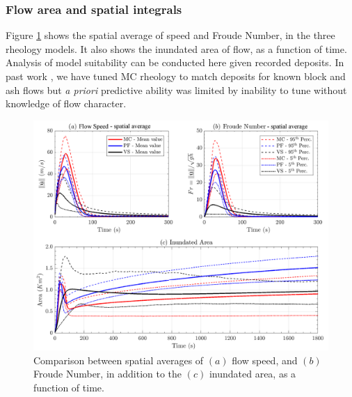 \documentclass{article}
\begin{document}
\subsubsection{Flow area and spatial integrals}
Figure \ref{fig:Colima-spatial} shows the spatial average of speed and Froude Number, in the three rheology models. It also shows the inundated area of flow, as a function of time. Analysis of model suitability can be conducted here given recorded deposits. In past work \cite{Patra2005}, we have tuned MC rheology to match deposits for known block and ash flows but {\it a priori} predictive ability was limited by inability to tune without knowledge of flow character.
\begin{figure}[H]
        \centering
        \includegraphics[width=1\textwidth]{BAF_VolcanDeColima/AveragedMeasurments/Averaged_MeasuresColima.png}
        \caption{Comparison between spatial averages of $(a)$ flow speed, and $(b)$ Froude Number, in addition to the $(c)$ inundated area, as a function of time.}
        \label{fig:Colima-spatial}
\end{figure}
\end{document}
